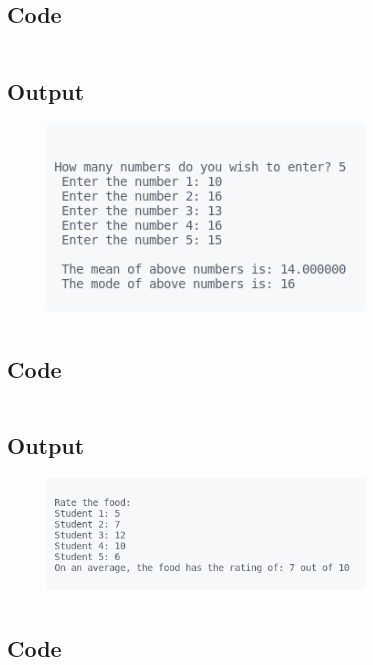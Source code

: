 \documentclass[12pt]{article}
\begin{document}
\subsection{Code}
\inputminted{c}{q6.c}
\newpage
\subsection{Output}
\begin{figure}[h]
    \centering
    \includegraphics[width=0.75\textwidth]{6.png}
\end{figure}

\newpage
\section{}
\subsection{Code}
\inputminted{c}{q7.c}
\subsection{Output}
\begin{figure}[h]
    \centering
    \includegraphics[width=0.75\textwidth]{7.png}
\end{figure}

\newpage
\section{}
\subsection{Code}
\inputminted{c}{q8.c}
\newpage
\end{document}
